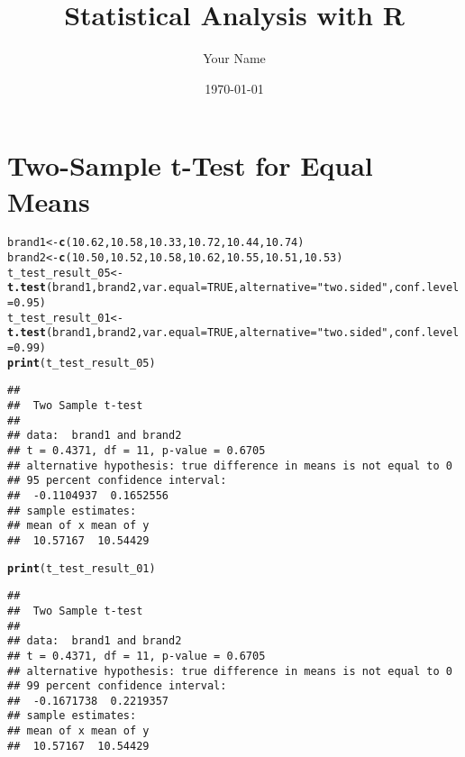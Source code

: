 \documentclass{article}\usepackage[]{graphicx}\usepackage[]{xcolor}
\makeatletter
\newcommand{\hlnum}[1]{\textcolor[rgb]{0.686,0.059,0.569}{#1}}%
\newcommand{\hlsng}[1]{\textcolor[rgb]{0.192,0.494,0.8}{#1}}%
\newcommand{\hldef}[1]{\textcolor[rgb]{0.345,0.345,0.345}{#1}}%
\newcommand{\hlkwb}[1]{\textcolor[rgb]{0.69,0.353,0.396}{#1}}%
\newcommand{\hlkwc}[1]{\textcolor[rgb]{0.333,0.667,0.333}{#1}}%
\newcommand{\hlkwd}[1]{\textcolor[rgb]{0.737,0.353,0.396}{\textbf{#1}}}%
\newenvironment{kframe}{%
 \def\at@end@of@kframe{}%
 \ifinner\ifhmode%
  \def\at@end@of@kframe{\end{minipage}}%
  \begin{minipage}{\columnwidth}%
 \fi\fi%
 \def\FrameCommand##1{\hskip\@totalleftmargin \hskip-\fboxsep
 \colorbox{shadecolor}{##1}\hskip-\fboxsep
     \hskip-\linewidth \hskip-\@totalleftmargin \hskip\columnwidth}%
 \MakeFramed {\advance\hsize-\width
   \@totalleftmargin\z@ \linewidth\hsize
   \@setminipage}}%
 {\par\unskip\endMakeFramed%
 \at@end@of@kframe}
\newenvironment{knitrout}{}{} %
\makeatother
\begin{document}
\title{Statistical Analysis with R}
\author{Your Name}
\date{\today}
\maketitle

\section{Two-Sample t-Test for Equal Means}
\begin{knitrout}
\color{fgcolor}\begin{kframe}
\begin{alltt}
\hldef{brand1} \hlkwb{<-} \hlkwd{c}\hldef{(}\hlnum{10.62}\hldef{,} \hlnum{10.58}\hldef{,} \hlnum{10.33}\hldef{,} \hlnum{10.72}\hldef{,} \hlnum{10.44}\hldef{,} \hlnum{10.74}\hldef{)}
\hldef{brand2} \hlkwb{<-} \hlkwd{c}\hldef{(}\hlnum{10.50}\hldef{,} \hlnum{10.52}\hldef{,} \hlnum{10.58}\hldef{,} \hlnum{10.62}\hldef{,} \hlnum{10.55}\hldef{,} \hlnum{10.51}\hldef{,} \hlnum{10.53}\hldef{)}
\hldef{t_test_result_05} \hlkwb{<-} \hlkwd{t.test}\hldef{(brand1, brand2,} \hlkwc{var.equal} \hldef{=} \hlnum{TRUE}\hldef{,} \hlkwc{alternative} \hldef{=} \hlsng{"two.sided"}\hldef{,} \hlkwc{conf.level} \hldef{=} \hlnum{0.95}\hldef{)}
\hldef{t_test_result_01} \hlkwb{<-} \hlkwd{t.test}\hldef{(brand1, brand2,} \hlkwc{var.equal} \hldef{=} \hlnum{TRUE}\hldef{,} \hlkwc{alternative} \hldef{=} \hlsng{"two.sided"}\hldef{,} \hlkwc{conf.level} \hldef{=} \hlnum{0.99}\hldef{)}
\hlkwd{print}\hldef{(t_test_result_05)}
\end{alltt}
\begin{verbatim}
## 
## 	Two Sample t-test
## 
## data:  brand1 and brand2
## t = 0.4371, df = 11, p-value = 0.6705
## alternative hypothesis: true difference in means is not equal to 0
## 95 percent confidence interval:
##  -0.1104937  0.1652556
## sample estimates:
## mean of x mean of y 
##  10.57167  10.54429
\end{verbatim}
\begin{alltt}
\hlkwd{print}\hldef{(t_test_result_01)}
\end{alltt}
\begin{verbatim}
## 
## 	Two Sample t-test
## 
## data:  brand1 and brand2
## t = 0.4371, df = 11, p-value = 0.6705
## alternative hypothesis: true difference in means is not equal to 0
## 99 percent confidence interval:
##  -0.1671738  0.2219357
## sample estimates:
## mean of x mean of y 
##  10.57167  10.54429
\end{verbatim}
\end{kframe}
\end{knitrout}
\end{document}
